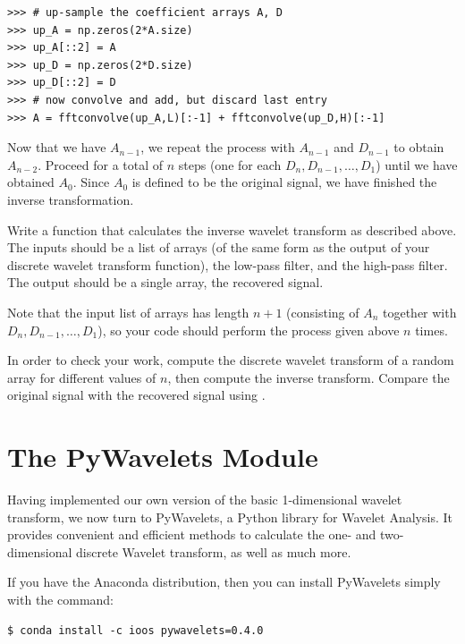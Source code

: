 \newpage

\begin{lstlisting}
>>> # up-sample the coefficient arrays A, D
>>> up_A = np.zeros(2*A.size)
>>> up_A[::2] = A
>>> up_D = np.zeros(2*D.size)
>>> up_D[::2] = D
>>> # now convolve and add, but discard last entry
>>> A = fftconvolve(up_A,L)[:-1] + fftconvolve(up_D,H)[:-1]
\end{lstlisting}

Now that we have $A_{n-1}$, we repeat the process with $A_{n-1}$ and $D_{n-1}$ to obtain
$A_{n-2}$. Proceed for a total of $n$ steps (one for each $D_n, D_{n-1},\ldots ,D_1$) until we have obtained $A_0$.
Since $A_0$ is defined to be the original
signal, we have finished the inverse transformation.

\begin{problem} %
Write a function that calculates the inverse wavelet transform as described above.
The inputs should be a list of arrays (of the same form as the output of your discrete
wavelet transform function), the low-pass filter, and the high-pass filter.
The output should be a single array, the recovered signal.

Note that the input list of arrays has length $n+1$ (consisting of $A_n$ together with
$D_n, D_{n-1}, \ldots, D_1$), so your code should perform the process given above $n$ times.

In order to check your work, compute
the discrete wavelet transform of a random array for different values of $n$, then compute the inverse
transform.
Compare the original signal with the recovered signal using .
\end{problem}

\section*{The PyWavelets Module} %

Having implemented our own version of the basic 1-dimensional wavelet transform, we now turn to
PyWavelets, a Python library for Wavelet Analysis.
It provides convenient and efficient methods to calculate the one- and two-dimensional discrete Wavelet
transform, as well as much more.

If you have the Anaconda distribution, then you can install PyWavelets simply with the command:

\begin{lstlisting}
$ conda install -c ioos pywavelets=0.4.0
\end{lstlisting}

